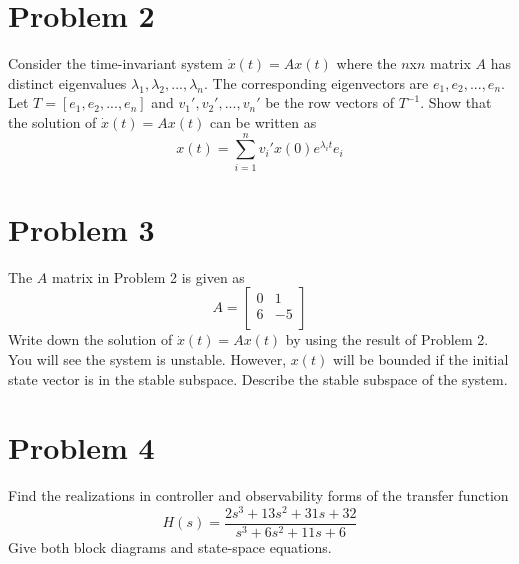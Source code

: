 \documentclass{article}
\begin{document}
\section*{Problem 2}
Consider the time-invariant system $\dot{x}(t) = Ax(t)$ where the $n$x$n$ matrix $A$ has distinct eigenvalues $\lambda_1, \lambda_2, ..., \lambda_n$.
The corresponding eigenvectors are $e_1, e_2, ...,e_n$.
Let $T = [e_1,e_2,...,e_n]$ and $v_1', v_2',...,v_n'$ be the row vectors of $T^{-1}$.
Show that the solution of $\dot{x}(t)=Ax(t)$ can be written as
$$ x(t) = \sum_{i=1}^n v_i' x(0) e^{\lambda_i t} e_i $$
\newline
\newline

\section*{Problem 3}
The $A$ matrix in Problem 2 is given as
$$ A =
\begin{bmatrix}
0 & 1 \\
6 & -5 \\
\end{bmatrix}
$$
Write down the solution of $\dot{x}(t) = Ax(t)$ by using the result of Problem 2.
You will see the system is unstable.
However, $x(t)$ will be bounded if the initial state vector is in the stable subspace.
Describe the stable subspace of the system.
\newline


\section*{Problem 4}
Find the realizations in controller and observability forms of the transfer function
$$ H(s) = \frac{2s^3+13s^2+31s+32}{s^3+6s^2+11s+6} $$
Give both block diagrams and state-space equations.
\end{document}
